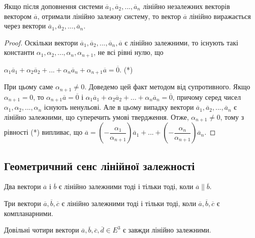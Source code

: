 \begin{claim}
	Якщо після доповнення системи $\overline{a}_1, \overline{a}_2, ..., \overline{a}_n$ лінійно незалежних
	векторів вектором $\overline{a}$, отримали лінійно залежну систему, то вектор $\overline{a}$ лінійно
	виражається через вектори $\overline{a}_1, \overline{a}_2, ..., \overline{a}_n$.
\end{claim}
\begin{proof}
	Оскільки вектори $\overline{a}_1, \overline{a}_2, ..., \overline{a}_n, \overline{a}$ є лінійно залежними, то існують
	такі константи $\alpha_1, \alpha_2, ..., \alpha_n, \alpha_{n+1}$, не всі рівні нулю, що
	
	$\alpha_1\overline{a}_1 + \alpha_2\overline{a}_2 + ... + \alpha_n\overline{a}_n + \alpha_{n+1}\overline{a} = \overline{0}$. (*)
	
	При цьому саме $\alpha_{n+1} \neq 0$. Доведемо цей факт методом від супротивного. Якщо
	$\alpha_{n+1} = 0$, то $\alpha_{n+1}\overline{a} = \overline{0}$ і $\alpha_1\overline{a}_1 + \alpha_2\overline{a}_2 + ... + \alpha_n\overline{a}_n = \overline{0}$, причому серед чисел
	$\alpha_1, \alpha_2, ..., \alpha_n$ існують ненульові. Але в цьому випадку вектори $\overline{a}_1, \overline{a}_2, ..., \overline{a}_n$ є 
	лінійно залежними, що суперечить умові твердження. Отже, $\alpha_{n+1} \neq 0$, тому з
	рівності (*) випливає, що $\overline{a} = \left(-\dfrac{\alpha_1}{\alpha_{n+1}}\right)\overline{a}_1 + ... + \left(-\dfrac{\alpha_n}{\alpha_{n+1}}\right)\overline{a}_n$.
\end{proof}

\subsection*{Геометричний сенс лінійної залежності}

\begin{claim}
	Два вектори $\overline{a}$ і $\overline{b}$ є лінійно залежними тоді і тільки тоді, коли $\overline{a} \parallel \overline{b}$.
\end{claim}

\begin{claim}
	Три вектори $\overline{a}, \overline{b}, \overline{c}$ є лінійно залежними тоді і тільки тоді, коли $\overline{a}, \overline{b}, \overline{c}$ є компланарними. 
\end{claim}

\begin{claim}
	Довільні чотири вектори $\overline{a}, \overline{b}, \overline{c}, \overline{d} \in E^3$ є завжди лінійно залежними.
\end{claim}

